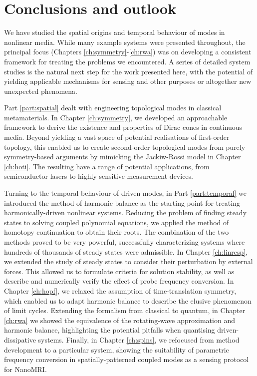 
\chapter*{Conclusions and outlook}

We have studied the spatial origins and temporal behaviour of modes in nonlinear media. While many example systems were presented throughout, the principal focus (Chapters \ref{ch:symmetry}-\ref{ch:rwa}) was on developing a consistent framework for treating the problems we encountered. A series of detailed system studies is the natural next step for the work presented here, with the potential of yielding applicable mechanisms for sensing and other purposes or altogether new unexpected phenomena. 

Part \ref{part:spatial} dealt with engineering topological modes in classical metamaterials. In Chapter \ref{ch:symmetry}, we developed an approachable framework to derive the existence and properties of Dirac cones in continuous media. Beyond yielding a vast space of potential realisations of first-order topology, this enabled us to create second-order topological modes from purely symmetry-based arguments by mimicking the Jackiw-Rossi model in Chapter \ref{ch:hoti}. The resulting have a range of potential applications, from semiconductor lasers to highly sensitive measurement devices. 

Turning to the temporal behaviour of driven modes, in Part \ref{part:temporal} we introduced the method of harmonic balance as the starting point for treating harmonically-driven nonlinear systems. Reducing the problem of finding steady states to solving coupled polynomial equations, we applied the method of homotopy continuation to obtain their roots. The combination of the two methods proved to be very powerful, successfully characterizing systems where hundreds of thousands of steady states were admissible. In Chapter \ref{ch:linresp}, we extended the study of steady states to consider their perturbation by external forces. This allowed us to formulate criteria for solution stability, as well as describe and numerically verify the effect of probe frequency conversion. In Chapter \ref{ch:hopf}, we relaxed the assumption of time-translation symmetry, which enabled us to adapt harmonic balance to describe the elusive phenomenon of limit cycles. Extending the formalism from classical to quantum, in Chapter \ref{ch:rwa} we showed the equivalence of the rotating-wave approximation and harmonic balance, highlighting the potential pitfalls when quantising driven-dissipative systems. Finally, in Chapter \ref{ch:spins}, we refocused from method development to a particular system, showing the suitability of parametric frequency conversion in spatially-patterned coupled modes as a sensing protocol for NanoMRI. 


